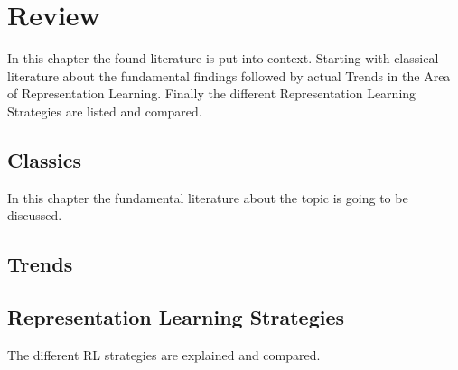 \chapter{Review}
In this chapter the found literature is put into context. Starting with classical literature about the fundamental findings followed by actual Trends in the Area of Representation Learning. Finally the different Representation Learning Strategies are listed and compared.
\section{Classics}
In this chapter the fundamental literature about the topic is going to be discussed. 
\section{Trends}
\section{Representation Learning Strategies}
The different RL strategies are explained and compared.